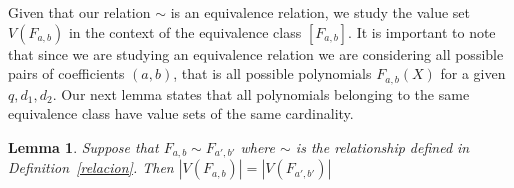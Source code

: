 \documentclass{article}
\newtheorem{lemma}[theorem]{Lemma}
\theoremstyle{definition}
\theoremstyle{remark}
\numberwithin{equation}{section}
\begin{document}
Given that our relation $\sim$ is an equivalence relation, we study the value set $V(F_{a,b})$ in the context of the equivalence class $[F_{a,b}]$. It is important to note that since we are studying an equivalence relation we are considering all possible pairs of coefficients $(a,b)$, that is all possible polynomials $F_{a,b}(X)$ for a given $q, d_1, d_2$. Our next lemma states that all polynomials belonging to the same equivalence class have value sets of the same cardinality.

\begin{lemma}
  
  Suppose that $F_{a,b} \sim F_{a',b'}$ where $\sim$ is the relationship defined in Definition~\ref{relacion}. Then $|V(F_{a,b})| = |V(F_{a',b'})|$

\end{lemma}
\end{document}
